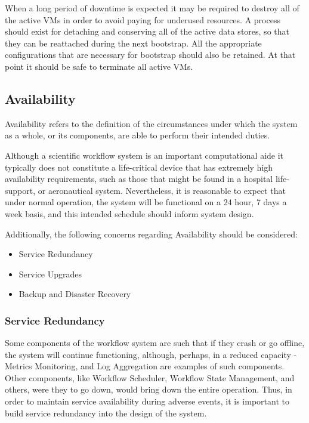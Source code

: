 When a long period of downtime is expected it may be required to destroy all of the active VMs in order to avoid paying for underused resources. A process should exist for detaching and conserving all of the active data stores, so that they can be reattached during the next bootstrap. All the appropriate configurations that are necessary for bootstrap should also be retained. At that point it should be safe to terminate all active VMs. 
\newpage
\subsection {Availability} \label{sec:availability}

Availability refers to the definition of the circumstances under which the system as a whole, or its components, are able to perform their intended duties.

Although a scientific workflow system is an important computational aide it typically does not constitute a life-critical device that has extremely high availability requirements, such as those that might be found in a hospital life-support, or aeronautical system. Nevertheless, it is reasonable to expect that under normal operation, the system will be functional on a 24 hour, 7 days a week basis, and this intended schedule should inform system design.

Additionally, the following concerns regarding Availability should be considered:

\begin{itemize}
\item Service Redundancy
\item Service Upgrades
\item Backup and Disaster Recovery
\end{itemize}

\subsubsection {Service Redundancy}

Some components of the workflow system are such that if they crash or go offline, the system will continue functioning, although, perhaps, in a reduced capacity - Metrics Monitoring, and Log Aggregation are examples of such components. Other components, like Workflow Scheduler, Workflow State Management, and others, were they to go down, would bring down the entire operation. Thus, in order to maintain service availability during adverse events, it is important to build service redundancy into the design of the system.

